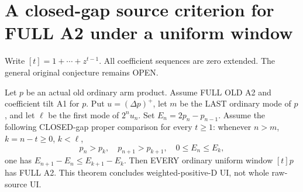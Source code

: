 \section{A closed-gap source criterion for FULL A2 under a uniform window}
Write $[t]=1+\cdots+z^{t-1}$. All coefficient sequences are zero extended.
The general original conjecture remains OPEN.

\begin{theorem}
Let $p$ be an actual old ordinary arm product. Assume FULL OLD A2
and coefficient tilt A1 for $p$. Put $u=(\Delta p)^+$, let $m$ be
the LAST ordinary mode of $p$, and let $\ell$ be the first mode of
$2^nu_n$. Set $E_n=2p_n-p_{n-1}$.
Assume the following CLOSED-gap proper comparison for every $t\ge1$:
whenever $n>m$, $k=n-t\ge0$, $k<\ell$,
\[
 p_n>p_k,\quad p_{n+1}>p_{k+1},\quad 0\le E_n\le E_k,
\]
one has $E_{n+1}-E_n\le E_{k+1}-E_k$.
Then EVERY ordinary uniform window $[t]p$ has FULL A2.
This theorem concludes weighted-positive-D UI, not whole raw-source UI.
\end{theorem}
